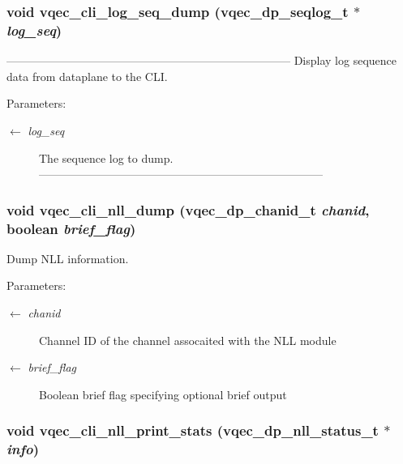 \subsubsection{\setlength{\rightskip}{0pt plus 5cm}void vqec\_\-cli\_\-log\_\-seq\_\-dump (vqec\_\-dp\_\-seqlog\_\-t $\ast$ {\em log\_\-seq})}\label{vqec__cli__interface_8h_27e4d3047112f08fbd51658f2b53cd55}


--------------------------------------------------------------------------- Display log sequence data from dataplane to the CLI.

\begin{Desc}
\item[Parameters:]
\begin{description}
\item[\mbox{$\leftarrow$} {\em log\_\-seq}]The sequence log to dump. --------------------------------------------------------------------------- \end{description}
\end{Desc}
\subsubsection{\setlength{\rightskip}{0pt plus 5cm}void vqec\_\-cli\_\-nll\_\-dump (vqec\_\-dp\_\-chanid\_\-t {\em chanid}, boolean {\em brief\_\-flag})}\label{vqec__cli__interface_8h_01a294c164c64d538c527fcc67fe8e54}


Dump NLL information.

\begin{Desc}
\item[Parameters:]
\begin{description}
\item[\mbox{$\leftarrow$} {\em chanid}]Channel ID of the channel assocaited with the NLL module \item[\mbox{$\leftarrow$} {\em brief\_\-flag}]Boolean brief flag specifying optional brief output \end{description}
\end{Desc}
\subsubsection{\setlength{\rightskip}{0pt plus 5cm}void vqec\_\-cli\_\-nll\_\-print\_\-stats (vqec\_\-dp\_\-nll\_\-status\_\-t $\ast$ {\em info})}\label{vqec__cli__interface_8h_07bffba071684f5d99949115f560a3b5}


